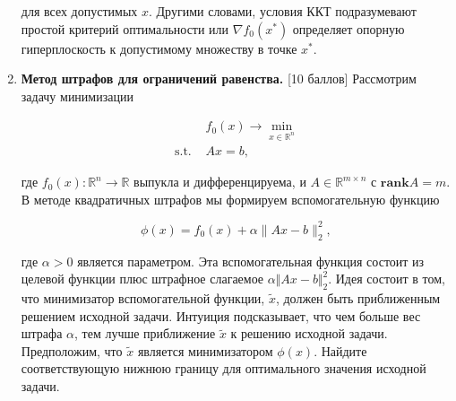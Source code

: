 \documentclass[
  russian,
  letterpaper,
  DIV=11,
  numbers=noendperiod]{scrartcl}
\begin{document}
\begin{enumerate}
  для всех допустимых \(x\). Другими словами, условия ККТ подразумевают
  простой критерий оптимальности или \(\nabla f_0(x^*)\) определяет
  опорную гиперплоскость к допустимому множеству в точке \(x^*\).
\item
  \textbf{Метод штрафов для ограничений равенства.} {[}10 баллов{]}
  Рассмотрим задачу минимизации

  \[
   \begin{split}
   & f_0(x) \to \min\limits_{x \in \mathbb{R}^{n} }\\
   \text{s.t. } & Ax = b,
   \end{split}
   \]

  где \(f_0(x): \mathbb{R}^n \to\mathbb{R}\) выпукла и дифференцируема,
  и \(A \in \mathbb{R}^{m \times n}\) с \(\mathbf{rank }A = m\). В
  методе квадратичных штрафов мы формируем вспомогательную функцию

  \[
   \phi(x) = f_0(x) + \alpha \|Ax - b\|_2^2,
   \]

  где \(\alpha > 0\) является параметром. Эта вспомогательная функция
  состоит из целевой функции плюс штрафное слагаемое
  \(\alpha \Vert Ax - b\Vert_2^2\). Идея состоит в том, что минимизатор
  вспомогательной функции, \(\tilde{x}\), должен быть приближенным
  решением исходной задачи. Интуиция подсказывает, что чем больше вес
  штрафа \(\alpha\), тем лучше приближение \(\tilde{x}\) к решению
  исходной задачи. Предположим, что \(\tilde{x}\) является минимизатором
  \(\phi(x)\). Найдите соответствующую нижнюю границу для оптимального
  значения исходной задачи.
\end{enumerate}
\end{document}
